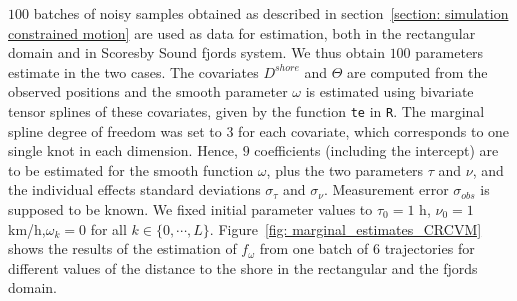 \documentclass[11pt]{article}
\newcommand {\1}{\mathbb{1}}
\begin{document}
$100$ batches of noisy samples obtained as described in section~\ref{section: simulation constrained motion} are used as data for estimation, both in the rectangular domain and in Scoresby Sound fjords system. We thus obtain $100$ parameters estimate in the two cases. The covariates $D^{shore}$ and $\Theta$ are computed from the observed positions and the smooth parameter $\omega$ is estimated using bivariate tensor splines of these covariates, given by the function \texttt{te} in \texttt{R}. The marginal spline degree of freedom was set to $3$ for each covariate, which corresponds to one single knot in each dimension. Hence, $9$ coefficients (including the intercept) are to be estimated for the smooth function $\omega$, plus the two parameters $\tau$ and $\nu$, and the individual effects standard deviations $\sigma_{\tau}$ and $\sigma_{\nu}$. Measurement error $\sigma_{obs}$ is supposed to be known. 
We fixed initial parameter values to $\tau_0=1$ h, $\nu_0 = 1$ km/h,$\omega_k=0$ for all $k \in \{0,\cdots,L\}$. Figure~\ref{fig: marginal_estimates_CRCVM} shows the results of the estimation of $f_{\omega}$ from one batch of $6$ trajectories for different values of the distance to the shore in the rectangular and the fjords domain.
\end{document}

